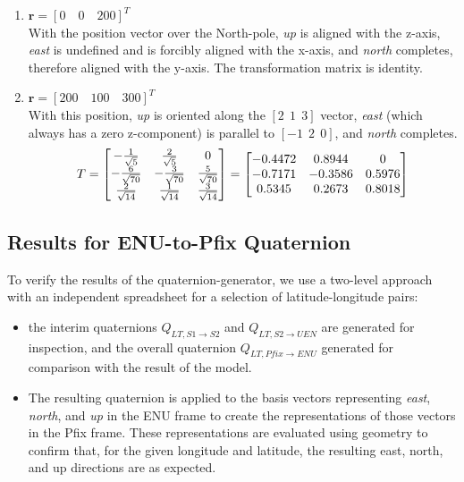 \documentclass[11pt,fleqn]{report}
\begin{document}
\begin{enumerate}
 \item $\textbf{r} = [0 \quad 0 \quad 200]^T$ \\
 With the position vector over the North-pole,
 \textit{up} is aligned with the z-axis,
 \textit{east} is undefined and is forcibly aligned with the x-axis,
 and \textit{north} completes, therefore aligned with the y-axis. The
 transformation matrix is identity.

 \item $\textbf{r} = [200 \quad 100 \quad 300]^T$ \\
 With this position,
 \textit{up} is oriented along the $[2~~1 ~~ 3]$ vector,
 \textit{east} (which always has a zero z-component) is parallel
 to $[-1~~ 2 ~~0]$,
 and \textit{north} completes.
 \begin{equation*}
\hfill T =
\begin{bmatrix}
 -\frac{1}{\sqrt5}&\frac{2}{\sqrt5} & 0 \\
 -\frac{6}{\sqrt{70}} & -\frac{3}{\sqrt{70}} & \frac{5}{\sqrt{70}} \\
\frac{2}{\sqrt{14}} &\frac{1}{\sqrt{14}} & \frac{3}{\sqrt{14}}
\end{bmatrix}
=
\begin{bmatrix}
-0.4472 & 0.8944 & 0 \\
-0.7171 &-0.3586 & 0.5976 \\
 0.5345 & 0.2673 & 0.8018
\end{bmatrix} \hfill
 \end{equation*}
\end{enumerate}

\subsection{Results for ENU-to-Pfix Quaternion}
To verify the results of the quaternion-generator, we use a two-level
approach with an independent spreadsheet for a selection of
latitude-longitude pairs:
\begin{itemize}
\item the interim quaternions $Q_{LT, S1 \rightarrow S2}$ and
$Q_{LT, S2 \rightarrow UEN}$ are generated for inspection, and
the overall quaternion $Q_{LT, Pfix \rightarrow ENU}$ generated for
comparison with the result of the model.
\item The resulting quaternion is applied to the basis vectors
representing \textit{east}, \textit{north}, and \textit{up} in the
ENU frame to create the representations of those vectors in the Pfix
frame. These representations are evaluated using geometry to confirm
that, for the given longitude and latitude, the resulting east,
north, and up directions are as expected.
\end {itemize}
\end{document}
